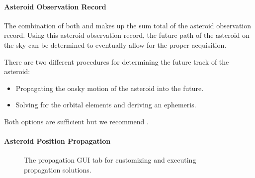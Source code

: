 \documentclass[letterpaper,11pt,english]{sphinxmanual}
\begin{document}
\paragraph{Asteroid Observation Record}
\label{\detokenize{user/manual_mode:asteroid-observation-record}}\label{\detokenize{user/manual_mode:user-manual-mode-procedure-asteroid-observation-record}}
\sphinxAtStartPar
The combination of both {\hyperref[\detokenize{user/manual_mode:user-manual-mode-procedure-historical-observations}]{}}
and {\hyperref[\detokenize{user/manual_mode:user-manual-mode-procedure-asteroid-on-sky-position}]{}} makes up the
sum total of the asteroid observation record. Using this asteroid observation
record, the future path of the asteroid on the sky can be determined to
eventually allow for the proper acquisition.

\sphinxAtStartPar
There are two different procedures for determining the future track of the
asteroid:
\begin{itemize}
\item {} 
\sphinxAtStartPar
Propagating the on\sphinxhyphen{}sky motion of the asteroid into the future.

\item {} 
\sphinxAtStartPar
Solving for the orbital elements and deriving an ephemeris.

\end{itemize}

\sphinxAtStartPar
Both options are sufficient but we recommend
{\hyperref[\detokenize{user/manual_mode:user-manual-mode-procedure-asteroid-position-propagation}]{}}.


\paragraph{Asteroid Position Propagation}
\label{\detokenize{user/manual_mode:asteroid-position-propagation}}\label{\detokenize{user/manual_mode:user-manual-mode-procedure-asteroid-position-propagation}}
\begin{figure}[htbp]
\centering
\capstart

\noindent{}
\caption{The propagation GUI tab for customizing and executing propagation solutions.}\label{\detokenize{user/manual_mode:id7}}\label{\detokenize{user/manual_mode:figure-manual-mode-gui-propagate}}\end{figure}
\end{document}
